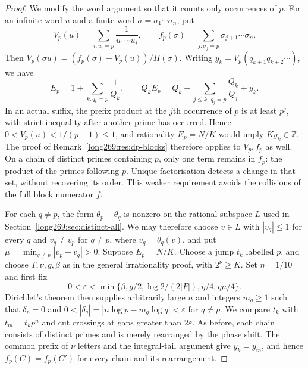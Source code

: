 \documentclass[11pt]{article}
\theoremstyle{remark}
\theoremstyle{plain}
\begin{document}
\begin{proof}
We modify the word argument so that it counts only occurrences of $p$.
For an infinite word $u$ and a finite word $\sigma=\sigma_1\cdots\sigma_n$,
put
\[
 V_p(u)=\sum_{i:u_i=p}\frac1{u_1\cdots u_i},\qquad
 f_p(\sigma)=\sum_{j:\sigma_j=p}\sigma_{j+1}\cdots\sigma_n.
\]
Then $V_p(\sigma u)=(f_p(\sigma)+V_p(u))/\Pi(\sigma)$. Writing
$y_k=V_p(q_{k+1}q_{k+2}\cdots)$, we have
\[
 E_p=1+\sum_{k:q_k=p}\frac1{Q_k},\qquad
 Q_kE_p=Q_k+\sum_{j\le k,\ q_j=p}\frac{Q_k}{Q_j}+y_k.
\]
In an actual suffix, the prefix product at the $j$th occurrence of $p$
is at least $p^j$, with strict inequality after another prime has
occurred. Hence $0<V_p(u)<1/(p-1)\le1$, and rationality $E_p=N/K$
would imply $Ky_k\in\mathbb Z$. The proof of
Remark~\ref{long269:res:dp-blocks} therefore applies to $V_p,f_p$ as well.
On a chain of distinct primes containing $p$, only one term remains in
$f_p$: the product of the primes following $p$. Unique factorisation
detects a change in that set, without recovering its order. This weaker
requirement avoids the collisions of the full block numerator $f$.

For each $q\ne p$, the form $\theta_p-\theta_q$ is nonzero on the
rational subspace $L$ used in Section~\ref{long269:sec:distinct-all}.
We may therefore choose $v\in L$ with $|v_q|\le1$ for every $q$ and
$v_q\ne v_p$ for $q\ne p$, where $v_q=\theta_q(v)$, and put
$\mu=\min_{q\ne p}|v_p-v_q|>0$. Suppose $E_p=N/K$. Choose a jump
$t_k$ labelled $p$, and choose $T,\nu,g,\beta$ as in the general
irrationality proof, with $2^\nu\ge K$. Set $\eta=1/10$ and first fix
\[
 0<\varepsilon<\min\{\beta,g/2,\log2/(2|P|),\eta/4,\eta\mu/4\}.
\]
Dirichlet's theorem then supplies arbitrarily large $n$ and integers
$m_q\ge1$ such that $\delta_p=0$ and
$0<|\delta_q|=|n\log p-m_q\log q|<\varepsilon$ for $q\ne p$.
We compare $t_k$ with $t_m=t_kp^n$ and cut crossings at gaps greater than
$2\varepsilon$. As before, each chain consists of distinct primes and
is merely rearranged by the phase shift. The common prefix of $\nu$
letters and the integral-tail argument give $y_k=y_m$, and hence
$f_p(C)=f_p(C')$ for every chain and its rearrangement.


\end{proof}
\end{document}
